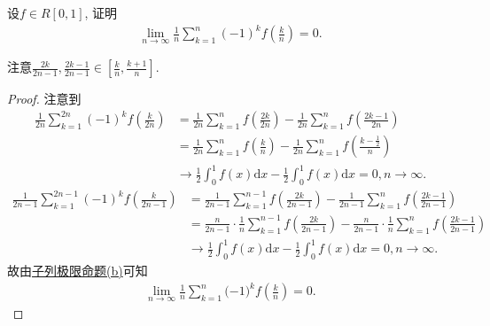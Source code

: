 \documentclass[../../main.tex]{subfiles}
\begin{document}
\begin{example}
设$f \in R[0,1]$, 证明
\begin{align*}
\lim_{n \to \infty} \frac{1}{n} \sum_{k=1}^{n} (-1)^k f\left( \frac{k}{n} \right) = 0.
\end{align*}
\end{example}
\begin{note}
注意$\frac{2k}{2n-1},\frac{2k-1}{2n-1}\in \left[ \frac{k}{n},\frac{k+1}{n} \right]$.
\end{note}
\begin{proof}
注意到
\begin{align*}
\frac{1}{2n}\sum_{k=1}^{2n}{\left( -1 \right) ^kf\left( \frac{k}{2n} \right)}&=\frac{1}{2n}\sum_{k=1}^n{f\left( \frac{2k}{2n} \right)}-\frac{1}{2n}\sum_{k=1}^n{f\left( \frac{2k-1}{2n} \right)}\\
&=\frac{1}{2n}\sum_{k=1}^n{f\left( \frac{k}{n} \right)}-\frac{1}{2n}\sum_{k=1}^n{f\left( \frac{k-\frac{1}{2}}{n} \right)}\\
&\rightarrow \frac{1}{2}\int_0^1{f\left( x \right) \mathrm{d}x}-\frac{1}{2}\int_0^1{f\left( x \right) \mathrm{d}x}=0,n\rightarrow \infty .
\end{align*}
\begin{align*}
\frac{1}{2n-1}\sum_{k=1}^{2n-1}{\left( -1 \right) ^kf\left( \frac{k}{2n-1} \right)}&=\frac{1}{2n-1}\sum_{k=1}^{n-1}{f\left( \frac{2k}{2n-1} \right)}-\frac{1}{2n-1}\sum_{k=1}^n{f\left( \frac{2k-1}{2n-1} \right)}\\
&=\frac{n}{2n-1}\cdot \frac{1}{n}\sum_{k=1}^{n-1}{f\left( \frac{2k}{2n-1} \right)}-\frac{n}{2n-1}\cdot \frac{1}{n}\sum_{k=1}^n{f\left( \frac{2k-1}{2n-1} \right)}\\
&\rightarrow \frac{1}{2}\int_0^1{f\left( x \right) \mathrm{d}x}-\frac{1}{2}\int_0^1{f\left( x \right) \mathrm{d}x}=0,n\rightarrow \infty .
\end{align*}
故由\hyperref[proposition:子列极限命题]{子列极限命题(b)}可知
\begin{align*}
\lim_{n\rightarrow \infty} \frac{1}{n}\sum_{k=1}^n{(}-1)^kf\left( \frac{k}{n} \right) =0.
\end{align*}
\end{proof}
\end{document}
